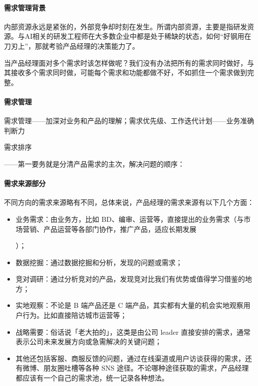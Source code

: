 \documentclass[letterpaper,11pt,english]{sphinxmanual}
\begin{document}
\paragraph{需求管理背景}
\label{\detokenize{chapter_knowledge/upgrade_manage:id8}}
内部资源永远是紧张的，外部竞争却时刻在发生。所谓内部资源，主要是指研发资源。与AI相关的研发工程师在大多数企业中都是处于稀缺的状态，如何“好钢用在刀刃上”，那就考验产品经理的决策能力了。

当产品经理面对多个需求时该怎样做呢？我们没有办法把所有的需求同时做好，与其接收多个需求同时做，可能每个需求和功能都做不好，不如抓住一个需求做到完整。


\paragraph{需求管理}
\label{\detokenize{chapter_knowledge/upgrade_manage:id9}}
需求管理——加深对业务和产品的理解；需求优先级、工作迭代计划——业务准确判断力

需求排序
%
\begin{footnote}[582]\sphinxAtStartFootnote
{}
%
\end{footnote}——第一要务就是分清产品需求的主次，解决问题的顺序：


\paragraph{需求来源部分}
\label{\detokenize{chapter_knowledge/upgrade_manage:id10}}
不同方向的需求来源略有不同，总体来说，产品经理的需求来源有以下几个方面：
\begin{itemize}
\item {} 
业务需求：由业务方，比如
BD、编审、运营等，直接提出的业务需求（与市场营销、产品运营等各部门协作，推广产品，适应长期发展%
\begin{footnote}[583]\sphinxAtStartFootnote
{}
%
\end{footnote}）；

\item {} 
数据挖掘：通过数据挖掘和分析，发现的问题或需求；

\item {} 
竞对调研：通过分析竞对的产品，发现竞对比我们有优势或值得学习借鉴的地方；

\item {} 
实地观察：不论是 B 端产品还是 C
端产品，其实都有大量的机会实地观察用户行为。比如直接陪访城市运营等；

\item {} 
战略需要：俗话说「老大拍的」，这类是由公司 leader
直接安排的需求，通常表示公司未来发展方向或急需解决的关键问题；

\item {} 
其他还包括客服、商服反馈的问题，通过在线渠道或用户访谈获得的需求，还有微博、朋友圈吐槽等各种
SNS
途径。不论哪种途径获取的需求，产品经理都应该有一个自己的需求池，统一记录各种想法。

\end{itemize}
\end{document}
